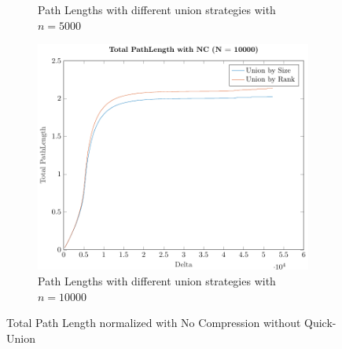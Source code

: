 \begin{figure}[ht]
\begin{subfigure}{0.32\textwidth}
        \caption{Path Lengths with different union strategies with $n = 5000$}
    \end{subfigure}%
    \hfill
    \begin{subfigure}{0.32\textwidth}
        \centering
        \includegraphics[width=\textwidth]{../images/plotNCNonFull10000_PathLength.pdf}
        \caption{Path Lengths with different union strategies with $n = 10000$}
    \end{subfigure}

    \caption{Total Path Length normalized with No Compression without Quick-Union}
    \label{fig:tplNCNoQU}
\end{figure}

